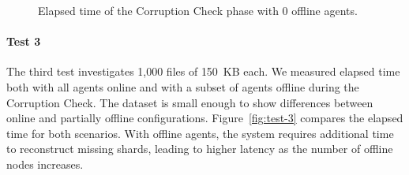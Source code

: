 \begin{figure}[!ht]
\centering
{}
\caption{Elapsed time of the Corruption Check phase with 0 offline agents.}
\label{fig:test-2}
\end{figure}

\newpage
\paragraph{Test 3}
The third test investigates 1,000 files of 150~KB each. We measured elapsed time both with all agents online and with a subset of agents offline during the Corruption Check. The dataset is small enough to show differences between online and partially offline configurations. Figure~\ref{fig:test-3} compares the elapsed time for both scenarios. With offline agents, the system requires additional time to reconstruct missing shards, leading to higher latency as the number of offline nodes increases.


